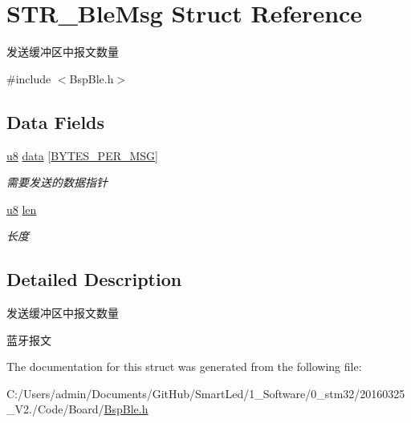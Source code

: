 \hypertarget{struct_s_t_r___ble_msg}{\section{\-S\-T\-R\-\_\-\-Ble\-Msg \-Struct \-Reference}
\label{struct_s_t_r___ble_msg}
}


发送缓冲区中报文数量  




{\ttfamily \#include $<$\-Bsp\-Ble.\-h$>$}

\subsection*{\-Data \-Fields}
\begin{DoxyCompactItemize}
\item 
\hypertarget{struct_s_t_r___ble_msg_a4f944cec6014c985b0d4807028bd7dbc}{\hyperlink{group___b_s_p_gaed742c436da53c1080638ce6ef7d13de}{u8} \hyperlink{struct_s_t_r___ble_msg_a4f944cec6014c985b0d4807028bd7dbc}{data} \mbox{[}\hyperlink{group___b_l_e_ga404ec81438167db1999e16f77f79760d}{\-B\-Y\-T\-E\-S\-\_\-\-P\-E\-R\-\_\-\-M\-S\-G}\mbox{]}}\label{struct_s_t_r___ble_msg_a4f944cec6014c985b0d4807028bd7dbc}

\begin{DoxyCompactList}\small\item\em 需要发送的数据指针 \end{DoxyCompactList}\item 
\hypertarget{struct_s_t_r___ble_msg_afbf3f3230446569534d5f466aaf4c23b}{\hyperlink{group___b_s_p_gaed742c436da53c1080638ce6ef7d13de}{u8} \hyperlink{struct_s_t_r___ble_msg_afbf3f3230446569534d5f466aaf4c23b}{len}}\label{struct_s_t_r___ble_msg_afbf3f3230446569534d5f466aaf4c23b}

\begin{DoxyCompactList}\small\item\em 长度 \end{DoxyCompactList}\end{DoxyCompactItemize}


\subsection{\-Detailed \-Description}
发送缓冲区中报文数量 

蓝牙报文 

\-The documentation for this struct was generated from the following file\-:\begin{DoxyCompactItemize}
\item 
\-C\-:/\-Users/admin/\-Documents/\-Git\-Hub/\-Smart\-Led/1\-\_\-\-Software/0\-\_\-stm32/20160325\-\_\-\-V2./\-Code/\-Board/\hyperlink{_bsp_ble_8h}{\-Bsp\-Ble.\-h}\end{DoxyCompactItemize}

